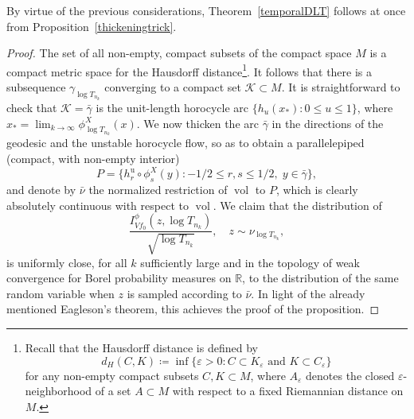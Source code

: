 \documentclass[JEP,XML,SOM,NoEqCountersInSection,Unicode,published]{cedram}
\newcommand \R{\mathbb{R}}
\DeclareMathOperator{\vol}{vol}
\theoremstyle{definition}
\begin{document}
\begin{appendix}
By virtue of the previous considerations, Theorem~\ref{temporalDLT} follows at once from Proposition~\ref{thickeningtrick}.

\begin{proof}
The set of all non-empty, compact subsets of the compact space $M$ is a compact metric space for the Hausdorff distance\footnote{Recall that the Hausdorff distance is defined by
\begin{equation*}
d_H(C,K)\coloneqq\inf\{\varepsilon >0:C\subset K_{\varepsilon} \text{ and }K\subset C_{\varepsilon} \}
\end{equation*}
for any non-empty compact subsets $C,K\subset M$, where $A_{\varepsilon }$ denotes the closed $\varepsilon $-neighborhood of a set $A\subset M$ with respect to a fixed Riemannian distance on $M$.}. It follows that there is a subsequence $\gamma_{\log{T_{n_k}}}$ converging to a compact set $\mathcal{K}\subset M$. It is straightforward to check that $\mathcal{K}=\bar{\gamma}$ is the unit-length horocycle arc $\{h_{u}(x_{*}):0\leq u\leq 1 \}$, where $x_*=\lim_{k\to\infty}\phi^{X}_{\log{T_{n_k}}}(x)$.
We now thicken the arc $\bar{\gamma}$ in the directions of the geodesic and the unstable horocycle flow, so as to obtain a parallelepiped (compact, with non-empty interior)
\begin{equation}
\label{parallelepiped}
P=\{h^{\mathrm{u}}_{r}\circ \phi^{X}_s (y):-1/2\leq r,s\leq 1/2,\;y\in \bar{\gamma} \},
\end{equation}
and denote by $\bar{\nu}$ the normalized restriction of $\vol$ to $P$, which is clearly absolutely continuous with respect to $\vol$. We claim that the distribution of
\[
\frac{I_{Vf_0}^{\phi}(z,\log{T_{n_k}})}{\sqrt{\log{T_{n_k}}}},\quad z\sim \nu_{\log{T_{n_k}}},
\]
is uniformly close, for all $k$ sufficiently large and in the topology of weak convergence for Borel probability measures on $\R$, to the distribution of the same random variable when $z$ is sampled according to $\bar{\nu}$. In light of the already mentioned Eagleson's theorem, this achieves the proof of the proposition.


\end{proof}
\end{appendix}
\end{document}
